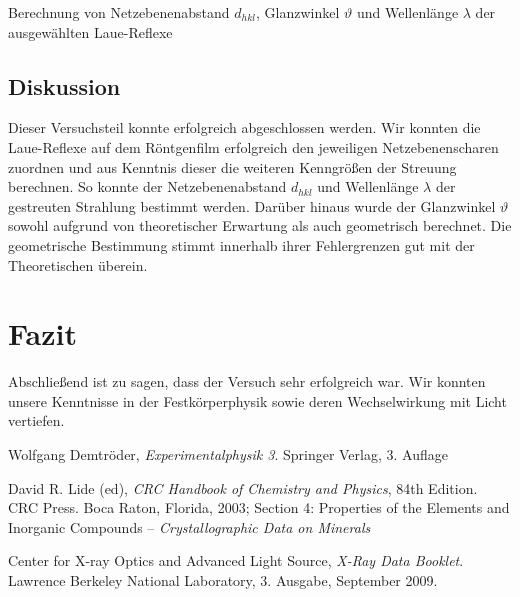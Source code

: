 \documentclass[11pt, a4paper]{article}
\begin{document}
\begin{table}[h]
\centering

\caption{Berechnung von Netzebenenabstand $d_{hkl}$, Glanzwinkel $\vartheta$ und Wellenlänge $\lambda$ der ausgewählten Laue-Reflexe}
\label{tab:laue_winkel}
\end{table}

\subsection{Diskussion}
Dieser Versuchsteil konnte erfolgreich abgeschlossen werden.
Wir konnten die Laue-Reflexe auf dem Röntgenfilm erfolgreich den jeweiligen Netzebenenscharen zuordnen und aus Kenntnis dieser die weiteren Kenngrößen der Streuung berechnen.
So konnte der Netzebenenabstand $d_{hkl}$ und Wellenlänge $\lambda$ der gestreuten Strahlung bestimmt werden.
Darüber hinaus wurde der Glanzwinkel $\vartheta$ sowohl aufgrund von theoretischer Erwartung als auch geometrisch berechnet.
Die geometrische Bestimmung stimmt innerhalb ihrer Fehlergrenzen gut mit der Theoretischen überein.


\section{Fazit}
Abschließend ist zu sagen, dass der Versuch sehr erfolgreich war.
Wir konnten unsere Kenntnisse in der Festkörperphysik sowie deren Wechselwirkung mit Licht vertiefen.




\begin{thebibliography}{9}
	Wolfgang Demtröder,
	\emph{Experimentalphysik 3}.
	Springer Verlag,
	3. Auflage

  David R. Lide (ed),
  \emph{CRC Handbook of Chemistry and Physics},
  84th Edition. CRC Press. Boca Raton, Florida, 2003;
  Section 4: Properties of the Elements and Inorganic Compounds --
  \emph{Crystallographic Data on Minerals}

  Center for X-ray Optics and Advanced Light Source,
  \emph{X-Ray Data Booklet}.
  Lawrence Berkeley National Laboratory,
  3. Ausgabe,
  September 2009.
\end{thebibliography}

\newpage
\end{document}

